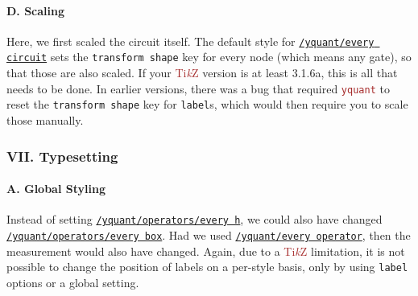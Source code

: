 \documentclass{scrartcl}
\makeatletter
\newenvironment{codeexample*}{%
   \VerbatimEnvironment%
   \let\FVB@VerbatimOut\minted@FVB@VerbatimOut
   \let\FVE@VerbatimOut\minted@FVE@VerbatimOut
   \minted@configlang{tex}%
   \minted@fvset
   \begin{VerbatimOut}[codes={\catcode`\^^I=12},firstline,lastline]{\minted@jobname.pyg}%
}{
   \end{VerbatimOut}%
   \minted@langlinenoson%
   \begin{adjustbox}{center}
       \minted@jobname.pyg %
   \end{adjustbox}\nopagebreak
   \expandafter\minted@pygmentize\expandafter{\minted@lang}%
   \minted@langlinenosoff%
   \par%
}
\def\TikZ{\textcolor{brown}{Ti\textit kZ}}
\def\pkg#1{\textcolor{brown}{\texttt{#1}}}
\def\style#1{\hyperref[style:#1]{\texttt{#1}}}
\def\Yquant{\pkg{yquant}}
\makeatother
\begin{document}
            \paragraph{D. Scaling}\leavevmode
               \begin{example}
                  \begin{codeexample*}
                  \end{codeexample*}
                  Here, we first scaled the circuit itself.
                  The default style for \style{/yquant/every circuit} sets the \texttt{transform shape} key for every node (which means any gate), so that those are also scaled.
                  If your \TikZ{} version is at least 3.1.6a, this is all that needs to be done.
                  In earlier versions, there was a bug that required \Yquant{} to reset the \texttt{transform shape} key for \texttt{label}s, which would then require you to scale those manually.
               \end{example}

         \clearpage
         \subsubsection{VII. Typesetting}
            \paragraph{A. Global Styling}\leavevmode
               \begin{example}
                  \begin{codeexample*}
                  \end{codeexample*}
                  Instead of setting \style{/yquant/operators/every h}, we could also have changed \style{/yquant/operators/every box}.
                  Had we used \style{/yquant/every operator}, then the measurement would also have changed.
                  Again, due to a \TikZ{} limitation, it is not possible to change the position of labels on a per\hyp style basis, only by using \texttt{label} options or a global setting.
               \end{example}
\end{document}
